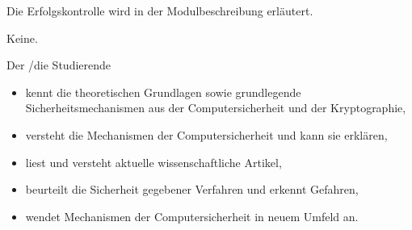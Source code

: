 \begin{course}

\setdoclanguagegerman
{}



\coursehead


\label{cour_7373.dp_997}


\begin{styleenv}
\begin{assessment}
Die Erfolgskontrolle wird in der Modulbeschreibung erläutert.


\end{assessment}

\begin{conditions}Keine.\end{conditions}


\end{styleenv}

\begin{learningoutcomes}
Der /die Studierende

 \begin{itemize}\item kennt die theoretischen Grundlagen sowie grundlegende Sicherheitsmechanismen aus der Computersicherheit und der Kryptographie,  \item versteht die Mechanismen der Computersicherheit und kann sie erklären,  \item liest und versteht aktuelle wissenschaftliche Artikel,  \item beurteilt die Sicherheit gegebener Verfahren und erkennt Gefahren,  \item wendet Mechanismen der Computersicherheit in neuem Umfeld an.  \end{itemize}
\end{learningoutcomes}


\end{course}
